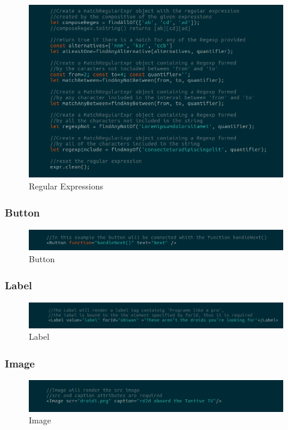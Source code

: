 \begin{figure}[H]
	\centering
	\includegraphics[width=14cm]{../../documenti/UserManualFramework/framework_model/6framework_model_regexp2.png}
	\caption{Regular Expressions}
\end{figure}

\subsubsection{Button}
\begin{figure}[H]
	\centering
	\includegraphics[width=14cm]{../../documenti/UserManualFramework/framework_view/11framework_view_button.png}
	\caption{Button}
\end{figure}

\subsubsection{Label}
\begin{figure}[H]
	\centering
	\includegraphics[width=14cm]{../../documenti/UserManualFramework/framework_view/12framework_view_label.png}
	\caption{Label}
\end{figure}

\subsubsection{Image}
\begin{figure}[H]
	\centering
	\includegraphics[width=14cm]{../../documenti/UserManualFramework/framework_view/13framework_view_image.png}
	\caption{Image}
\end{figure}

